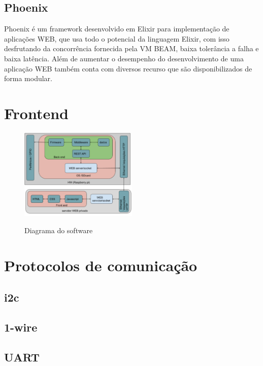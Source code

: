 \documentclass[../../layout.tex]{subfiles}
\begin{document}
\subsection{Phoenix}
\hspace*{3em}Phoenix é um framework desenvolvido em Elixir para implementação de aplicações WEB, que usa todo o potencial da linguagem Elixir, com isso desfrutando da concorrência fornecida pela VM BEAM, baixa tolerância a falha e baixa latência.  Além de aumentar o desempenho do desenvolvimento de  uma aplicação WEB também conta com diversos recurso que são disponibilizados de forma modular\cite{phoenix}.


\section{Frontend}
\hspace*{3em}\blindtext[1]

\begin{figure}[H]
\centering
\caption{Diagrama do software}
\includegraphics[width=0.5\textwidth]{assets/static/img/diagrama_tcc.PNG}
\label{fig:diagrama_sw}
\end{figure}

\section{Protocolos de comunicação} 
\hspace*{3em}\blindtext[1]
\subsection{i2c}
\hspace*{3em}\blindtext[1]
\subsection{1-wire}
\hspace*{3em}\blindtext[1]
\subsection{UART}
\hspace*{3em}\blindtext[1]
\end{document}
